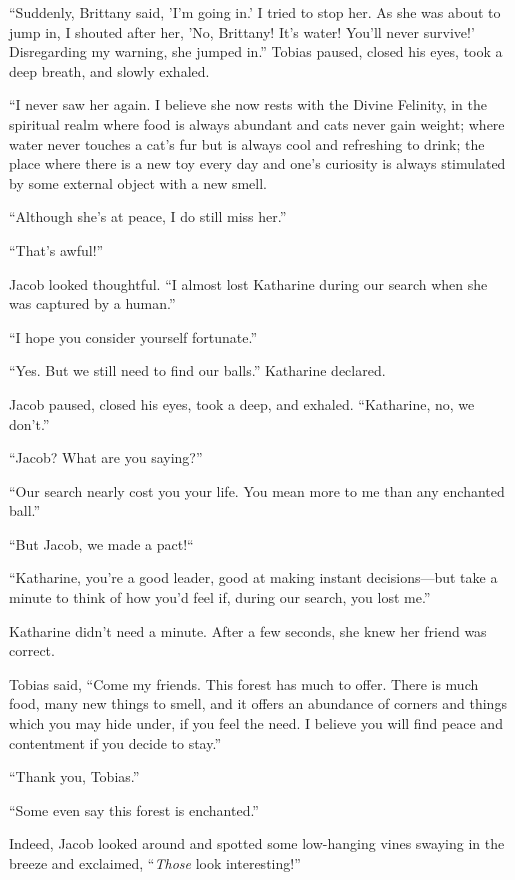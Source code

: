 “Suddenly, Brittany said, 'I'm going in.' I tried to stop her. As she was about to jump in, I shouted after her, 'No, Brittany! It's water! You'll never survive!' Disregarding my warning, she jumped in.” Tobias paused, closed his eyes, took a deep breath, and slowly exhaled.

“I never saw her again. I believe she now rests with the Divine Felinity, in the spiritual realm where food is always abundant and cats never gain weight; where water never touches a cat's fur but is always cool and refreshing to drink; the place where there is a new toy every day and one's curiosity is always stimulated by some external object with a new smell.

“Although she's at peace, I do still miss her.”

“That's awful!”

Jacob looked thoughtful. “I almost lost Katharine during our search when she was captured by a human.”

“I hope you consider yourself fortunate.”

“Yes. But we still need to find our balls.” Katharine declared.

Jacob paused, closed his eyes, took a deep, and exhaled. “Katharine, no, we don't.”

“Jacob? What are you saying?”

“Our search nearly cost you your life. You mean more to me than any enchanted ball.”

“But Jacob, we made a pact!“

“Katharine, you're a good leader, good at making instant decisions—but take a minute to think of how you'd feel if, during our search, you lost me.”

Katharine didn't need a minute. After a few seconds, she knew her friend was correct.

Tobias said, “Come my friends. This forest has much to offer. There is much food, many new things to smell, and it offers an abundance of corners and things which you may hide under, if you feel the need. I believe you will find peace and contentment if you decide to stay.”

“Thank you, Tobias.”

“Some even say this forest is enchanted.”

Indeed, Jacob looked around and spotted some low-hanging vines swaying in the breeze and exclaimed, “\textit{Those} look interesting!”